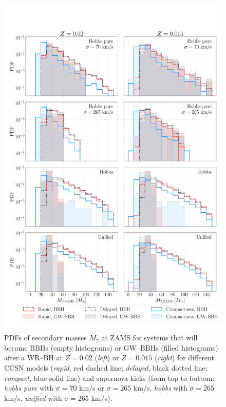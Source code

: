\documentclass[a4paper,titlepage]{book}     	%
\begin{document}
\begin{appendices}
\begin{figure}
	\centering
	\includegraphics[width=\textwidth]{./images/progM2.pdf}	
	\caption{PDFs of secondary masses $M_2$ at ZAMS for systems that will become BBHs (empty histograms) or GW--BBHs (filled histograms) after a WR--BH at $Z=0.02$ (\emph{left}) or $Z=0.015$ (\emph{right}) for different CCSN models (\emph{rapid}, red dashed line; \emph{delayed}, black dotted line; \emph{compact}, blue solid line) and supernova kicks (from top to bottom: \emph{hobbs pure} with $\sigma = 70$ km/s or $\sigma = 265$ km/s, \emph{hobbs} with $\sigma = 265$ km/s, \emph{unified} with $\sigma = 265$ km/s).}\label{fig:resultsM2prog}
\end{figure}


\end{appendices}
\end{document}
